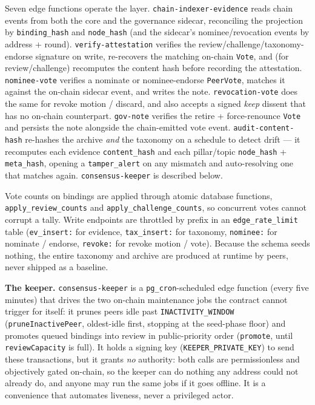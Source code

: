 \documentclass[11pt,a4paper]{article}
\begin{document}
Seven edge functions operate the layer.
\texttt{chain-indexer-evidence} reads chain events from both the core
and the governance sidecar, reconciling the projection by
\texttt{binding\_hash} and \texttt{node\_hash} (and the sidecar's
nominee/revocation events by address + round).
\texttt{verify-attestation} verifies the review/challenge/taxonomy-endorse
signature on write, re-recovers the matching on-chain \texttt{Vote},
and (for review/challenge) recomputes the content hash before recording
the attestation. \texttt{nominee-vote} verifies a nominate or
nominee-endorse \texttt{PeerVote}, matches it against the on-chain
sidecar event, and writes the note. \texttt{revocation-vote} does the
same for revoke motion / discard, and also accepts a signed
\emph{keep} dissent that has no on-chain counterpart.
\texttt{gov-note} verifies the retire + force-renounce \texttt{Vote}
and persists the note alongside the chain-emitted vote event.
\texttt{audit-content-hash} re-hashes the archive \emph{and} the
taxonomy on a schedule to detect drift --- it recomputes each evidence
\texttt{content\_hash} and each pillar/topic \texttt{node\_hash} +
\texttt{meta\_hash}, opening a \texttt{tamper\_alert} on any mismatch
and auto-resolving one that matches again. \texttt{consensus-keeper}
is described below.

Vote counts on bindings are applied through atomic database functions,
\texttt{apply\_review\_counts} and \texttt{apply\_challenge\_counts},
so concurrent votes cannot corrupt a tally. Write endpoints are
throttled by prefix in an \texttt{edge\_rate\_limit} table
(\texttt{ev\_insert:} for evidence, \texttt{tax\_insert:} for taxonomy,
\texttt{nominee:} for nominate / endorse, \texttt{revoke:} for revoke
motion / vote). Because the schema seeds nothing, the entire taxonomy
and archive are produced at runtime by peers, never shipped as a
baseline.

\textbf{The keeper.} \texttt{consensus-keeper} is a \texttt{pg\_cron}-scheduled
edge function (every five minutes) that drives the two on-chain maintenance
jobs the contract cannot trigger for itself: it prunes peers idle past
\texttt{INACTIVITY\_WINDOW} (\texttt{pruneInactivePeer}, oldest-idle first,
stopping at the seed-phase floor) and promotes queued bindings into review in
public-priority order (\texttt{promote}, until \texttt{reviewCapacity} is
full). It holds a signing key (\texttt{KEEPER\_PRIVATE\_KEY}) to send these
transactions, but it grants \emph{no} authority: both calls are permissionless
and objectively gated on-chain, so the keeper can do nothing any address could
not already do, and anyone may run the same jobs if it goes offline. It is a
convenience that automates liveness, never a privileged actor.
\end{document}
